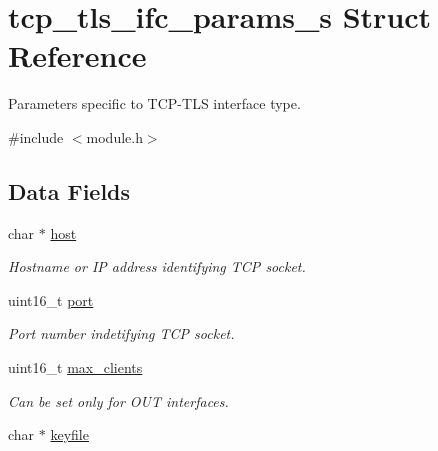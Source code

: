 \hypertarget{structtcp__tls__ifc__params__s}{}\section{tcp\+\_\+tls\+\_\+ifc\+\_\+params\+\_\+s Struct Reference}
\label{structtcp__tls__ifc__params__s}


Parameters specific to T\+C\+P-\/\+T\+LS interface type.  




{\ttfamily \#include $<$module.\+h$>$}

\subsection*{Data Fields}
\begin{DoxyCompactItemize}
\item 
\mbox{\label{structtcp__tls__ifc__params__s_a390a0b6d8f9664c8283a09fd33dce77e}} 
char $\ast$ \hyperlink{structtcp__tls__ifc__params__s_a390a0b6d8f9664c8283a09fd33dce77e}{host}
\begin{DoxyCompactList}\small\item\em Hostname or IP address identifying T\+CP socket. \end{DoxyCompactList}\item 
\mbox{\label{structtcp__tls__ifc__params__s_a1d56ee43bd0777668b626c66f4c19bec}} 
uint16\+\_\+t \hyperlink{structtcp__tls__ifc__params__s_a1d56ee43bd0777668b626c66f4c19bec}{port}
\begin{DoxyCompactList}\small\item\em Port number indetifying T\+CP socket. \end{DoxyCompactList}\item 
uint16\+\_\+t \hyperlink{structtcp__tls__ifc__params__s_aa71bfab820fc8b16700bf6384270a9f6}{max\+\_\+clients}
\begin{DoxyCompactList}\small\item\em Can be set only for O\+UT interfaces. \end{DoxyCompactList}\item 
\mbox{\label{structtcp__tls__ifc__params__s_a51fd2c73f56e2148ea22821142b98d9c}} 
char $\ast$ \hyperlink{structtcp__tls__ifc__params__s_a51fd2c73f56e2148ea22821142b98d9c}{keyfile}

\end{DoxyCompactItemize}
